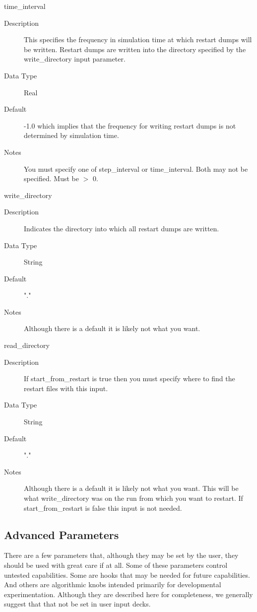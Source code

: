 \documentclass[11pt]{amsart}
\begin{document}
time\_interval
\begin{description}
\item [Description] This specifies the frequency in simulation time at which
restart dumps will be written.  Restart dumps are written into the directory
specified by the write\_directory input parameter.
\item [Data Type] Real
\item [Default] -1.0 which implies that the frequency for writing restart dumps
is not determined by simulation time.
\item [Notes] You must specify one of step\_interval or time\_interval.  Both
may not be specified.  Must be $>$ 0.
\end{description}

write\_directory
\begin{description}
\item [Description] Indicates the directory into which all restart dumps are
written.
\item [Data Type] String
\item [Default] "."
\item [Notes] Although there is a default it is likely not what you want.
\end{description}

read\_directory
\begin{description}
\item [Description] If start\_from\_restart is true then you must specify where
to find the restart files with this input.
\item [Data Type] String
\item [Default] "."
\item [Notes] Although there is a default it is likely not what you want.  This
will be what write\_directory was on the run from which you want to restart.
If start\_from\_restart is false this input is not needed.
\end{description}

\subsection*{Advanced Parameters}
There are a few parameters that, although they may be set by the user, they
should be used with great care if at all.  Some of these parameters control
untested capabilities.  Some are hooks that may be needed for future
capabilities.  And others are algorithmic knobs intended primarily for
developmental experimentation.  Although they are described here for
completeness, we generally suggest that that not be set in user input decks.
\end{document}

